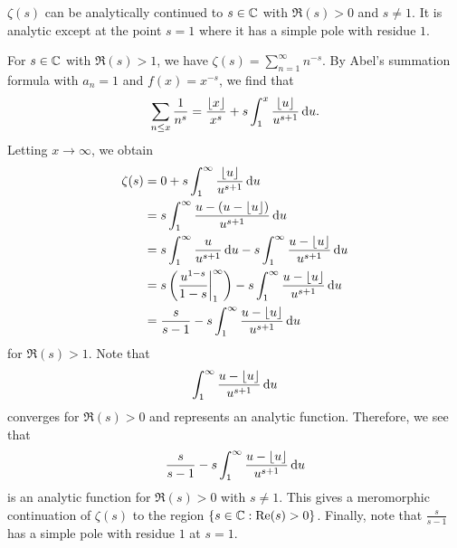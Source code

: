 \begin{thm}
$\zeta(s)$ can be analytically continued to $s \in \mathbb{C}$ with 
$\Re(s) > 0$ and $s \neq 1$. It is analytic except 
at the point $s = 1$ where it has a simple pole with residue
$1$. 
\end{thm}
\begin{pf}
For $s \in \mathbb{C}$ with $\Re(s) > 1$, we have 
$\zeta(s) = \sum_{n=1}^\infty n^{-s}$. By Abel's 
summation formula with $a_n = 1$ and $f(x) = x^{-s}$, 
we find that 
\[ \sum_{n\leq x} \frac{1}{n^s} = \frac{\lfloor x\rfloor}{x^s}
+ s\int_1^x \frac{\lfloor u\rfloor}{u^{s+1}}\,\mathrm{d} u. \]
Letting $x \to \infty$, we obtain 
\begin{align*}
    \zeta(s) &= 0 + s\int_1^\infty \frac{\lfloor u\rfloor}{u^{s+1}}\,\mathrm{d} u \\
    &= s \int_1^\infty \frac{u - (u - \lfloor u\rfloor)}{u^{s+1}}\,\mathrm{d} u \\
    &= s \int_1^\infty \frac{u}{u^{s+1}}\,\mathrm{d} u - 
    s \int_1^\infty \frac{u - \lfloor u\rfloor}{u^{s+1}}\,\mathrm{d} u \\
    &= s \left( \frac{u^{1-s}}{1-s} \biggr\rvert_1^\infty 
    \right)
    - s \int_1^\infty \frac{u - \lfloor u\rfloor}{u^{s+1}}\,\mathrm{d} u \\
    &= \frac{s}{s-1} - s \int_1^\infty \frac{u - \lfloor u\rfloor}{u^{s+1}}\,\mathrm{d} u
\end{align*}
for $\Re(s) > 1$. Note that 
\[ \int_1^\infty \frac{u - \lfloor u\rfloor}{u^{s+1}}\,\mathrm{d} u \]
converges for $\Re(s) > 0$ and represents an analytic function. Therefore, we see that 
\[ \frac{s}{s-1} - s \int_1^\infty \frac{u - \lfloor u\rfloor}{u^{s+1}}\,\mathrm{d} u \] 
is an analytic function for $\Re(s) > 0$ with $s \neq 1$. 
This gives a meromorphic continuation of $\zeta(s)$ 
to the region $\{s \in \mathbb{C} : {\rm Re}(s) > 0\}$. Finally, note that 
$\frac{s}{s-1}$ has a simple pole with residue $1$ at $s = 1$.
\end{pf}


